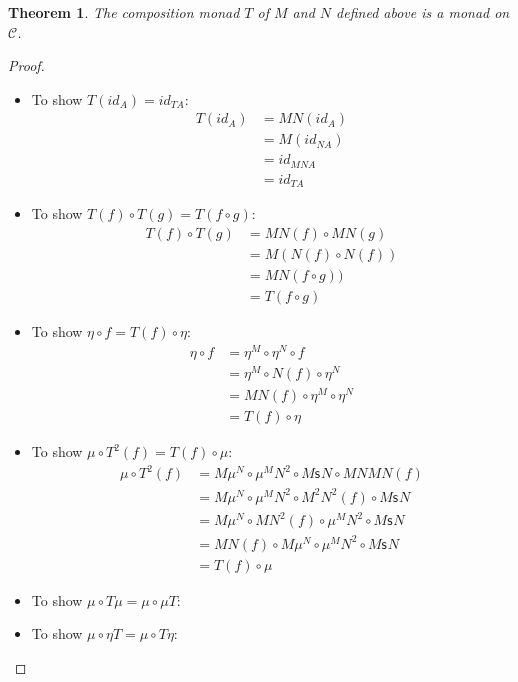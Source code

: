 \documentclass{article}
\newtheorem{theorem}{Theorem}
\newcommand{\cat}[1]{\mathcal{#1}}
\newcommand{\s}[1]{\mathsf{s}_{#1}}
\begin{document}
\begin{theorem}
  \label{thm:composition}
  The composition monad $T$ of $M$ and $N$ defined above is a monad on $\cat{C}$.
\end{theorem}
\begin{proof}
\begin{itemize}
  \item To show $T(id_A)=id_{TA}$:
    \begin{align*}
      T(id_A) &= MN(id_A)   \\
              &= M(id_{NA}) \\
              &= id_{MNA}   \\
              &= id_{TA}
    \end{align*}
  \item To show $T(f)\circ T(g)=T(f\circ g)$:
    \begin{align*}
      T(f)\circ T(g) &= MN(f)\circ MN(g)    \\
                     &= M(N(f)\circ N(f))   \\
                     &= MN(f\circ g))       \\
                     &= T(f\circ g)
    \end{align*}
  \item To show $\eta\circ f=T(f)\circ\eta$:
    \begin{align*}
      \eta\circ f &= \eta^M\circ\eta^N\circ f       \\
                  &= \eta^M\circ N(f)\circ\eta^N    \\
                  &= MN(f)\circ\eta^M\circ\eta^N    \\
                  &= T(f)\circ\eta
    \end{align*}
  \item To show $\mu\circ T^2(f)=T(f)\circ\mu$:
    \begin{align*}
      \mu\circ T^2(f) &= M\mu^N\circ\mu^M N^2\circ M\s{}N\circ MNMN(f)      \\
                      &= M\mu^N\circ\mu^M N^2\circ M^2N^2(f)\circ M\s{}N    \\
                      &= M\mu^N\circ MN^2(f)\circ\mu^M N^2\circ M\s{}N      \\
                      &= MN(f)\circ M\mu^N\circ\mu^M N^2\circ M\s{}N        \\
                      &= T(f)\circ\mu
    \end{align*}
  \item To show $\mu\circ T\mu=\mu\circ\mu T$:
  \item To show $\mu\circ\eta T=\mu\circ T\eta$:
\end{itemize}
\end{proof}
\end{document}
